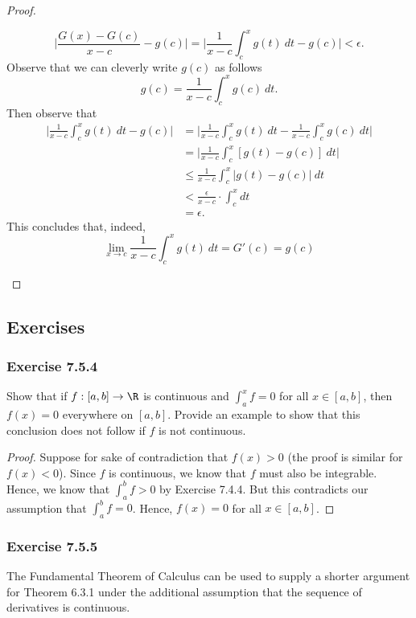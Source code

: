 \begin{proof}
\begin{enumerate}
		\[  \Big| \frac{ G(x) - G(c)  }{ x  -c  } - g(c)  \Big| = \Big| \frac{ 1 }{ x - c  } \int_{ c }^{ x } g(t) \ dt - g(c) \Big|  < \epsilon. \]
	Observe that we can cleverly write \( g(c)  \) as follows	
	\[  g(c) = \frac{ 1 }{ x -c  } \int_{ c }^{ x } g(c) \  dt. \] Then observe that 
	\begin{align*}
	    \Big| \frac{ 1 }{ x -c  } \int_{ c }^{ x } g(t) \  dt - g(c)  \Big| &= \Big| \frac{ 1 }{ x -c  } \int_{ c }^{ x } g(t)  \ dt - \frac{ 1 }{ x -c  } \int_{ c }^{ x } g(c) \   dt \Big|  \\
																			&= \Big| \frac{ 1 }{ x -c  } \int_{ c }^{ x } [ g(t) - g(c) ] \ dt \Big| \\
																			&\leq \frac{ 1 }{ x -c  } \int_{ c }^{ x } | g(t) - g(c) | \  dt \\
																			&< \frac{ \epsilon  }{ x- c  } \cdot \int_{ c }^{ x } dt  \\ 
																			&= \epsilon.
	\end{align*}
	This concludes that, indeed, 
	\[  \lim_{ x \to c } \frac{ 1 }{x -c  } \int_{ c }^{ x } g(t) \ dt = G'(c) = g(c) \]
\end{enumerate}
\end{proof}

\subsection{Exercises}


\subsubsection{Exercise 7.5.4} Show that if \( f: [a,b] \to \R  \) is continuous and \( \int_{ a }^{ x } f = 0   \) for all \( x \in [a,b]  \), then \( f(x) = 0  \) everywhere on \( [a,b]  \). Provide an example to show that this conclusion does not follow if \( f  \) is not continuous.
\begin{proof}
	Suppose for sake of contradiction that \( f(x) > 0  \) (the proof is similar for \( f(x) < 0  \)). Since \( f \) is continuous, we know that \( f  \) must also be integrable. Hence, we know that \( \int_{ a }^{ b } f   > 0  \) by Exercise 7.4.4. But this contradicts our assumption that \( \int_{ a }^{ b } f   = 0  \). Hence, \( f(x) = 0  \) for all \( x \in [a,b] \).
\end{proof}




\subsubsection{Exercise 7.5.5} The Fundamental Theorem of Calculus can be used to supply a shorter argument for Theorem 6.3.1 under the additional assumption that the sequence of derivatives is continuous.

